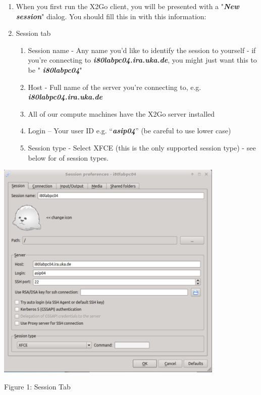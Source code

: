 \documentclass[
]{article}
\begin{document}
\begin{enumerate}
\def\labelenumi{\arabic{enumi}.}
\setcounter{enumi}{3}
\item
  When you first run the X2Go client, you will be presented with a
  "\emph{\textbf{New session}}" dialog. You should fill this in with
  this information:
\item
  Session tab

  \begin{enumerate}
  \def\labelenumii{\arabic{enumii}.}
  \item
    Session name - Any name you'd like to identify the session to
    yourself - if you're connecting to
    \emph{\textbf{i80labpc04.ira.uka.de}}, you might just want this to
    be " \emph{\textbf{i80labpc04}}"
  \item
    Host - Full name of the server you're connecting to, e.g.
    \emph{\textbf{i80labpc04.ira.uka.de}}
  \item
    All of our compute machines have the X2Go server installed
  \item
    Login -- Your user ID e.g. ``\emph{\textbf{asip04}}'' (be careful to
    use lower case)
  \item
    Session type - Select XFCE (this is the only supported session type)
    - see below for of session types.
  \end{enumerate}
\end{enumerate}

\includegraphics[width=4.28968in,height=4.17836in]{images/media/image1.png}

Figure 1: Session Tab
\end{document}
